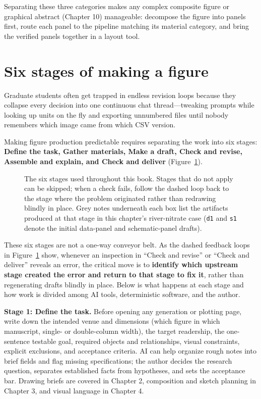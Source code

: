 Separating these three categories makes any complex composite figure or graphical abstract (Chapter 10) manageable: decompose the figure into panels first, route each panel to the pipeline matching its material category, and bring the verified panels together in a layout tool.

\section{Six stages of making a figure}

Graduate students often get trapped in endless revision loops because they collapse every decision into one continuous chat thread---tweaking prompts while looking up units on the fly and exporting unnumbered files until nobody remembers which image came from which CSV version.

Making figure production predictable requires separating the work into six stages: \textbf{Define the task, Gather materials, Make a draft, Check and revise, Assemble and explain, and Check and deliver} (Figure~\ref{fig:ch01-01}).

\begin{figure}[htbp]\centering
\resizebox{\linewidth}{!}{}
\caption{The six stages used throughout this book. Stages that do not apply can be skipped; when a check fails, follow the dashed loop back to the stage where the problem originated rather than redrawing blindly in place. Grey notes underneath each box list the artifacts produced at that stage in this chapter's river-nitrate case (\texttt{d1} and \texttt{s1} denote the initial data-panel and schematic-panel drafts).}\label{fig:ch01-01}
\end{figure}

These six stages are not a one-way conveyor belt. As the dashed feedback loops in Figure~\ref{fig:ch01-01} show, whenever an inspection in ``Check and revise'' or ``Check and deliver'' reveals an error, the critical move is to \textbf{identify which upstream stage created the error and return to that stage to fix it}, rather than regenerating drafts blindly in place. Below is what happens at each stage and how work is divided among AI tools, deterministic software, and the author.

\textbf{Stage 1: Define the task.} Before opening any generation or plotting page, write down the intended venue and dimensions (which figure in which manuscript, single- or double-column width), the target readership, the one-sentence testable goal, required objects and relationships, visual constraints, explicit exclusions, and acceptance criteria. AI can help organize rough notes into brief fields and flag missing specifications; the author decides the research question, separates established facts from hypotheses, and sets the acceptance bar. Drawing briefs are covered in Chapter 2, composition and sketch planning in Chapter 3, and visual language in Chapter 4.

